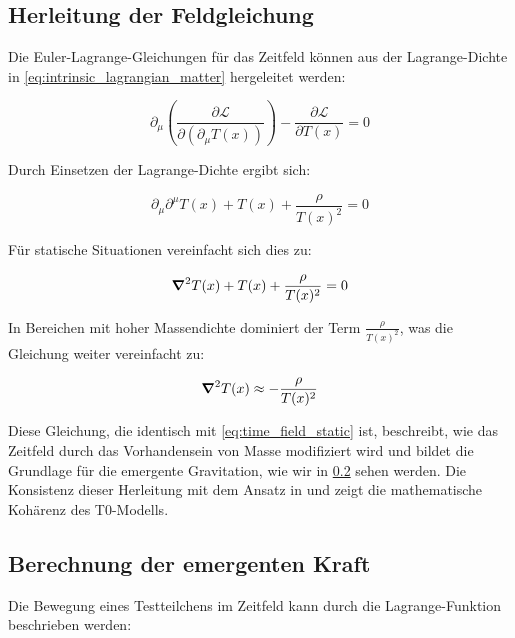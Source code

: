 \documentclass[12pt,a4paper]{article}
\newcommand{\Tfield}{T(x)}
\begin{document}
	\subsection{Herleitung der Feldgleichung}
	\label{subsec:field_equation}
	Die Euler-Lagrange-Gleichungen für das Zeitfeld können aus der Lagrange-Dichte in \cref{eq:intrinsic_lagrangian_matter} hergeleitet werden:
	
	\begin{equation}
		\label{eq:euler_lagrange}
		\partial_\mu \left( \frac{\partial \mathcal{L}}{\partial(\partial_\mu \Tfield)} \right) - \frac{\partial \mathcal{L}}{\partial \Tfield} = 0
	\end{equation}
	
	Durch Einsetzen der Lagrange-Dichte ergibt sich:
	
	\begin{equation}
		\label{eq:substituted_euler_lagrange}
		\partial_\mu \partial^\mu \Tfield + \Tfield + \frac{\rho}{\Tfield^2} = 0
	\end{equation}
	
	Für statische Situationen vereinfacht sich dies zu:
	
	\begin{equation}
		\label{eq:field_equation_static}
		\grad^2 \Tfield + \Tfield + \frac{\rho}{\Tfield^2} = 0
	\end{equation}
	
	In Bereichen mit hoher Massendichte dominiert der Term \(\frac{\rho}{\Tfield^2}\), was die Gleichung weiter vereinfacht zu:
	
	\begin{equation}
		\label{eq:field_equation_high_density}
		\grad^2 \Tfield \approx -\frac{\rho}{\Tfield^2}
	\end{equation}
	
	Diese Gleichung, die identisch mit \cref{eq:time_field_static} ist, beschreibt, wie das Zeitfeld durch das Vorhandensein von Masse modifiziert wird und bildet die Grundlage für die emergente Gravitation, wie wir in \cref{subsec:emergent_force} sehen werden. Die Konsistenz dieser Herleitung mit dem Ansatz in \cite{pascher_lagrange_2025} und \cite{pascher_higgs_2025} zeigt die mathematische Kohärenz des T0-Modells.
	
	\subsection{Berechnung der emergenten Kraft}
	\label{subsec:emergent_force}
	Die Bewegung eines Testteilchens im Zeitfeld kann durch die Lagrange-Funktion beschrieben werden:
	
\end{document}
